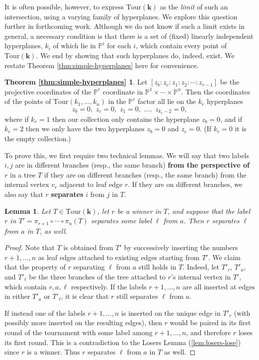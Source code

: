 \documentclass[11pt]{amsart}
\newcommand{\PP}{\mathbb{P}}
\newcommand{\defn}{\textbf}
\newcommand{\Tour}{\mathrm{Tour}}
\newtheorem{lemma}[thm]{Lemma}
\numberwithin{thm}{section}
\numberwithin{equation}{section}
\numberwithin{figure}{section}
\theoremstyle{definition}
\newtheorem*{HyperplanesThm}{Theorem \ref{thm:simple-hyperplanes}}
\begin{document}
It is often possible, however, to express $\Tour(\mathbf{k})$ as the \emph{limit} of such an intersection, using a varying family of hyperplanes. We explore this question further in forthcoming work. Although we do not know if such a limit exists in general, a necessary condition is that there is a set of (fixed) linearly independent hyperplanes, $k_i$ of which lie in $\PP^i$ for each $i$, which contain every point of $\Tour(\mathbf{k})$.  We end by showing that such hyperplanes do, indeed, exist.  We restate Theorem \ref{thm:simple-hyperplanes} here for convenience.


\begin{HyperplanesThm}
Let $[z_b:z_c:z_1:z_2:\cdots:z_{r-1}]$ be the projective coordinates of the $\PP^r$ coordinate in $\PP^1\times \cdots \times \PP^n$.  Then the coordinates of the points of $\Tour(k_1,\ldots,k_n)$ in the $\PP^r$ factor all lie on the $k_r$ hyperplanes
$$z_b=0,\,\, z_c=0,\,\, z_1=0,\,\, \ldots,\,\, z_{k_r-2}=0,$$ where if $k_r=1$ then our collection only contains the hyperplane $z_b=0$, and if $k_r=2$ then we only have the two hyperplanes $z_b=0$ and $z_c=0$.  (If $k_r=0$ it is the empty collection.)
\end{HyperplanesThm}

To prove this, we first require two technical lemmas.  We will say that two labels $i,j$ are in different branches (resp., the same branch) \defn{from the perspective of $r$} in a tree $T$ if they are on different branches (resp., the same branch) from the internal vertex $v_r$ adjacent to leaf edge $r$.  If they are on different branches, we also say that $r$ \defn{separates} $i$ from $j$ in $T$.

\begin{lemma}\label{lem:separation}
Let $T\in \Tour(\mathbf{k})$, let $r$ be a winner in $T$, and suppose that the label $r$ in $T'=\pi_{r+1}\circ \cdots \circ \pi_{n}(T)$ separates some label $\ell$ from $a$. Then $r$ separates $\ell$ from $a$ in $T$, as well.
\end{lemma}

\begin{proof}
Note that $T$ is obtained from $T'$ by successively inserting the numbers $r+1,\ldots,n$ as leaf edges attached to existing edges starting from $T'$.  We claim that the property of $r$ separating $\ell$ from $a$ still holds in $T$.  Indeed, let $T'_r$, $T'_a$, and $T'_\ell$ be the three branches of the tree attached to $r$'s internal vertex in $T'$, which contain $r,a,\ell$ respectively.   If the labels $r+1,\ldots,n$ are all inserted at edges in either $T'_a$ or $T'_\ell$, it is clear that $r$ still separates $\ell$ from $a$.

If instead one of the labels $r+1,\dots, n$ is inserted on the unique edge in $T'_r$ (with possibly more inserted on the resulting edges), then $r$ would be paired in its first round of the tournament with some label among $r+1,\ldots,n$, and therefore $r$ loses its first round.  This is a contradiction to the Losers Lemma (\ref{lem:losers-lose}) since $r$ is a winner.  Thus $r$ separates $\ell$ from $a$ in $T$ as well.  
\end{proof}
\end{document}
